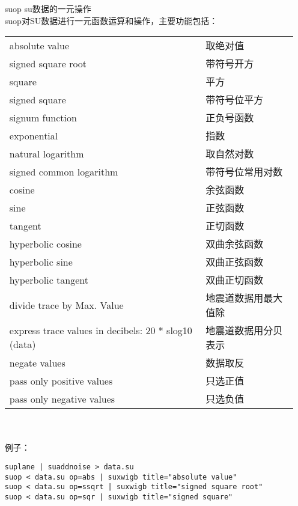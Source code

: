 \begin{enumerate}
	\item[suop] su数据的一元操作\\ 
	suop对SU数据进行一元函数运算和操作，主要功能包括：\par
	\begin{tabular}{p{}l}
		\toprule
			absolute value & 取绝对值	\\		
			signed square root & 带符号开方\\		
			square & 平方	\\		
			signed square & 带符号位平方\\			
			signum function & 正负号函数	\\		
			exponential & 指数\\			
			natural logarithm & 取自然对数\\			
			signed common logarithm & 带符号位常用对数	\\		
			cosine & 余弦函数\\			
			sine & 正弦函数	\\		
			tangent &  正切函数	\\		
			hyperbolic cosine &  双曲余弦函数	\\		
			hyperbolic sine & 双曲正弦函数\\			
			hyperbolic tangent & 双曲正切函数	\\		
			divide trace by Max. Value & 地震道数据用最大值除	\\		
			express trace values in decibels: 20 * slog10 (data) & 地震道数据用分贝表示\\			
			negate values & 数据取反\\			
			pass only positive values & 只选正值\\			
			pass only negative values & 只选负值\\
			\bottomrule
	\end{tabular}\\\\
	例子：
\begin{lstlisting}
suplane | suaddnoise > data.su
suop < data.su op=abs | suxwigb title="absolute value" 	
suop < data.su op=ssqrt | suxwigb title="signed square root" 	
suop < data.su op=sqr | suxwigb title="signed square" 	
\end{lstlisting}
	

\end{enumerate}

